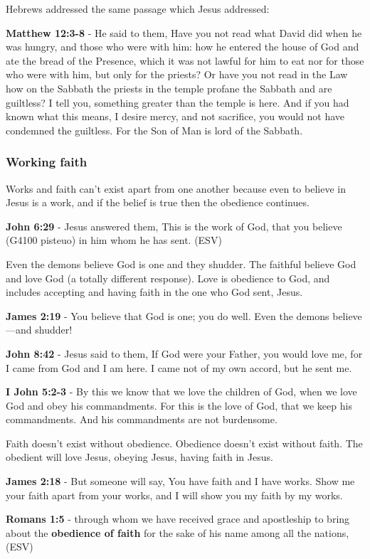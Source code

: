 \documentclass[11pt]{article}
\begin{document}
Hebrews addressed the same passage which Jesus addressed:

\textbf{Matthew 12:3-8} - He said to them, Have you not read what David did when he was hungry, and those who were with him: how he entered the house of God and ate the bread of the Presence, which it was not lawful for him to eat nor for those who were with him, but only for the priests? Or have you not read in the Law how on the Sabbath the priests in the temple profane the Sabbath and are guiltless? I tell you, something greater than the temple is here. And if you had known what this means, I desire mercy, and not sacrifice, you would not have condemned the guiltless. For the Son of Man is lord of the Sabbath.

\subsubsection{Working faith}
\label{sec:orgef1642a}
Works and faith can't exist apart from one another because even to believe in Jesus is a work, and if the belief is true then the obedience continues.

\textbf{John 6:29} -  Jesus answered them, This is the work of God, that you believe (G4100 pisteuo) in him whom he has sent. (ESV)

Even the demons believe God is one and they shudder. The faithful believe God and love God (a totally different response). Love is obedience to God, and includes accepting and having faith in the one who God sent, Jesus.

\textbf{James 2:19} - You believe that God is one; you do well. Even the demons believe—and shudder!

\textbf{John 8:42} - Jesus said to them, If God were your Father, you would love me, for I came from God and I am here. I came not of my own accord, but he sent me.

\textbf{I John 5:2-3} - By this we know that we love the children of God, when we love God and obey his commandments. For this is the love of God, that we keep his commandments. And his commandments are not burdensome.

Faith doesn't exist without obedience. Obedience doesn't exist without faith. The obedient will love Jesus, obeying Jesus, having faith in Jesus.

\textbf{James 2:18} - But someone will say, You have faith and I have works. Show me your faith apart from your works, and I will show you my faith by my works.

\textbf{Romans 1:5} - through whom we have received grace and apostleship to bring about the \textbf{obedience of faith} for the sake of his name among all the nations, (ESV)
\end{document}
